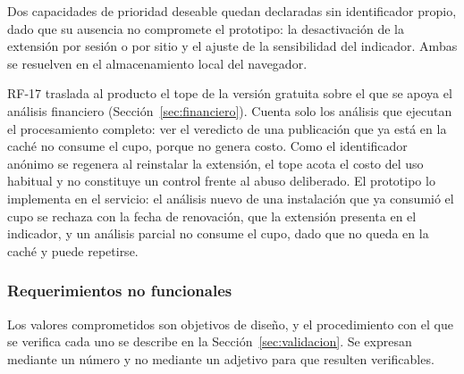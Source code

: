 Dos capacidades de prioridad deseable quedan declaradas sin identificador propio, dado que su ausencia no compromete el prototipo: la desactivación de la extensión por sesión o por sitio y el ajuste de la sensibilidad del indicador. Ambas se resuelven en el almacenamiento local del navegador.

RF-17 traslada al producto el tope de la versión gratuita sobre el que se apoya el análisis financiero (Sección~\ref{sec:financiero}). Cuenta solo los análisis que ejecutan el procesamiento completo: ver el veredicto de una publicación que ya está en la caché no consume el cupo, porque no genera costo. Como el identificador anónimo se regenera al reinstalar la extensión, el tope acota el costo del uso habitual y no constituye un control frente al abuso deliberado. El prototipo lo implementa en el servicio: el análisis nuevo de una instalación que ya consumió el cupo se rechaza con la fecha de renovación, que la extensión presenta en el indicador, y un análisis parcial no consume el cupo, dado que no queda en la caché y puede repetirse.

\subsubsection{Requerimientos no funcionales}

Los valores comprometidos son objetivos de diseño, y el procedimiento con el que se verifica cada uno se describe en la Sección~\ref{sec:validacion}. Se expresan mediante un número y no mediante un adjetivo para que resulten verificables.

